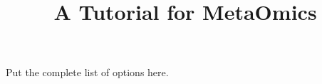 \documentclass{article}
\title{A Tutorial for MetaOmics}
\author{}
\date{ }
\begin{document}
 
\maketitle
 
\tableofcontents
 
 
 
 

 

 
 
 
 
 
 
 
 

{
\color{red}
Put the complete list of options here.
}



 
\end{document}
